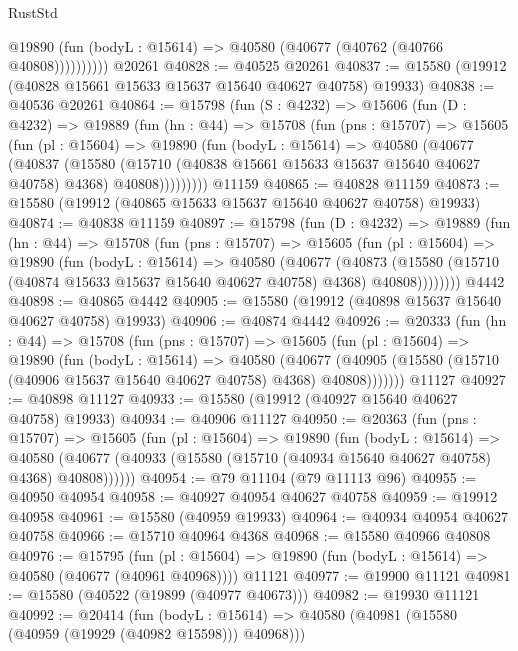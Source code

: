\begin{lexlean}{RustStd}
\begin{coremodule}
              @19890 (fun (bodyL : @15614) => @40580 (@40677 (@40762 (@40766 @40808))))))))))
    @20261
@40828 := @40525 @20261
@40837 := @15580 (@19912 (@40828 @15661 @15633 @15637 @15640 @40627 @40758) @19933)
@40838 := @40536 @20261
@40864 := @15798
    (fun (S : @4232) =>
    @15606
      (fun (D : @4232) =>
      @19889
        (fun (hn : @44) =>
        @15708
          (fun (pns : @15707) =>
          @15605
            (fun (pl : @15604) =>
            @19890
              (fun (bodyL : @15614) =>
              @40580
                (@40677
                  (@40837
                    (@15580
                      (@15710 (@40838 @15661 @15633 @15637 @15640 @40627 @40758) @4368)
                      @40808)))))))))
    @11159
@40865 := @40828 @11159
@40873 := @15580 (@19912 (@40865 @15633 @15637 @15640 @40627 @40758) @19933)
@40874 := @40838 @11159
@40897 := @15798
    (fun (D : @4232) =>
    @19889
      (fun (hn : @44) =>
      @15708
        (fun (pns : @15707) =>
        @15605
          (fun (pl : @15604) =>
          @19890
            (fun (bodyL : @15614) =>
            @40580
              (@40677
                (@40873
                  (@15580 (@15710 (@40874 @15633 @15637 @15640 @40627 @40758) @4368) @40808))))))))
    @4442
@40898 := @40865 @4442
@40905 := @15580 (@19912 (@40898 @15637 @15640 @40627 @40758) @19933)
@40906 := @40874 @4442
@40926 := @20333
    (fun (hn : @44) =>
    @15708
      (fun (pns : @15707) =>
      @15605
        (fun (pl : @15604) =>
        @19890
          (fun (bodyL : @15614) =>
          @40580
            (@40677
              (@40905 (@15580 (@15710 (@40906 @15637 @15640 @40627 @40758) @4368) @40808)))))))
    @11127
@40927 := @40898 @11127
@40933 := @15580 (@19912 (@40927 @15640 @40627 @40758) @19933)
@40934 := @40906 @11127
@40950 := @20363
    (fun (pns : @15707) =>
    @15605
      (fun (pl : @15604) =>
      @19890
        (fun (bodyL : @15614) =>
        @40580 (@40677 (@40933 (@15580 (@15710 (@40934 @15640 @40627 @40758) @4368) @40808))))))
@40954 := @79 @11104 (@79 @11113 @96)
@40955 := @40950 @40954
@40958 := @40927 @40954 @40627 @40758
@40959 := @19912 @40958
@40961 := @15580 (@40959 @19933)
@40964 := @40934 @40954 @40627 @40758
@40966 := @15710 @40964 @4368
@40968 := @15580 @40966 @40808
@40976 := @15795
    (fun (pl : @15604) => @19890 (fun (bodyL : @15614) => @40580 (@40677 (@40961 @40968))))
    @11121
@40977 := @19900 @11121
@40981 := @15580 (@40522 (@19899 (@40977 @40673)))
@40982 := @19930 @11121
@40992 := @20414
    (fun (bodyL : @15614) => @40580 (@40981 (@15580 (@40959 (@19929 (@40982 @15598))) @40968)))

\end{coremodule}
\end{lexlean}
